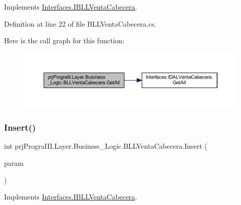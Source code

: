 Implements \hyperlink{interface_interfaces_1_1_i_b_l_l_venta_cabecera_ae3e14c66210f1065c4633869c97a0efd}{Interfaces.\+I\+B\+L\+L\+Venta\+Cabecera}.



Definition at line 22 of file B\+L\+L\+Venta\+Cabecera.\+cs.

Here is the call graph for this function\+:
\nopagebreak
\begin{figure}[H]
\begin{center}
\leavevmode
\includegraphics[width=350pt]{classprj_progra_i_i_i_1_1_layer_1_1_business___logic_1_1_b_l_l_venta_cabecera_a11eecee0fcc7e296eb741393161a1739_cgraph}
\end{center}
\end{figure}
\hypertarget{classprj_progra_i_i_i_1_1_layer_1_1_business___logic_1_1_b_l_l_venta_cabecera_a4e982cb2c77f88dd3d2ae1f8228ac3ae}{}\label{classprj_progra_i_i_i_1_1_layer_1_1_business___logic_1_1_b_l_l_venta_cabecera_a4e982cb2c77f88dd3d2ae1f8228ac3ae} 
\subsubsection{\texorpdfstring{Insert()}{Insert()}}
{\footnotesize\ttfamily int prj\+Progra\+I\+I\+I.\+Layer.\+Business\+\_\+\+Logic.\+B\+L\+L\+Venta\+Cabecera.\+Insert (\begin{DoxyParamCaption}\item[{\hyperlink{classprj_progra_i_i_i_1_1_layer_1_1_entities_1_1_venta_cabecera}{Venta\+Cabecera}}]{param }\end{DoxyParamCaption})}



Implements \hyperlink{interface_interfaces_1_1_i_b_l_l_venta_cabecera_a28aab27efa8b0bfbac32d24d814e7a76}{Interfaces.\+I\+B\+L\+L\+Venta\+Cabecera}.



